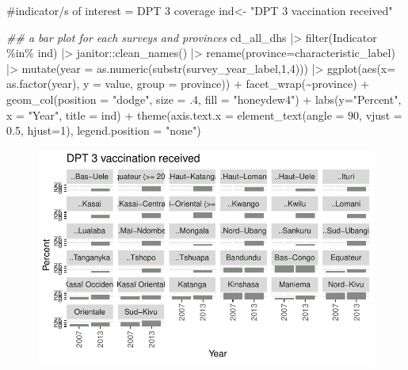 \documentclass[
  letterpaper,
  DIV=11,
  numbers=noendperiod]{scrreprt}
\newenvironment{Shaded}{\begin{snugshade}}{\end{snugshade}}
\newcommand{\AttributeTok}[1]{\textcolor[rgb]{0.40,0.45,0.13}{#1}}
\newcommand{\CommentTok}[1]{\textcolor[rgb]{0.37,0.37,0.37}{#1}}
\newcommand{\DecValTok}[1]{\textcolor[rgb]{0.68,0.00,0.00}{#1}}
\newcommand{\DocumentationTok}[1]{\textcolor[rgb]{0.37,0.37,0.37}{\textit{#1}}}
\newcommand{\FloatTok}[1]{\textcolor[rgb]{0.68,0.00,0.00}{#1}}
\newcommand{\FunctionTok}[1]{\textcolor[rgb]{0.28,0.35,0.67}{#1}}
\newcommand{\NormalTok}[1]{\textcolor[rgb]{0.00,0.23,0.31}{#1}}
\newcommand{\OtherTok}[1]{\textcolor[rgb]{0.00,0.23,0.31}{#1}}
\newcommand{\SpecialCharTok}[1]{\textcolor[rgb]{0.37,0.37,0.37}{#1}}
\newcommand{\StringTok}[1]{\textcolor[rgb]{0.13,0.47,0.30}{#1}}
\begin{document}
\begin{Shaded}
\begin{Highlighting}[]
\CommentTok{\#indicator/s of interest = DPT 3 coverage }
\NormalTok{ind}\OtherTok{\textless{}{-}} \StringTok{"DPT 3 vaccination received"}       

\DocumentationTok{\#\# a bar plot for each surveys and provinces    }
\NormalTok{cd\_all\_dhs }\SpecialCharTok{|\textgreater{}}      
   \FunctionTok{filter}\NormalTok{(Indicator }\SpecialCharTok{\%in\%}\NormalTok{ ind) }\SpecialCharTok{|\textgreater{}}
\NormalTok{  janitor}\SpecialCharTok{::}\FunctionTok{clean\_names}\NormalTok{() }\SpecialCharTok{|\textgreater{}}  
  \FunctionTok{rename}\NormalTok{(}\AttributeTok{province=}\NormalTok{characteristic\_label) }\SpecialCharTok{|\textgreater{}}
  \FunctionTok{mutate}\NormalTok{(}\AttributeTok{year =} \FunctionTok{as.numeric}\NormalTok{(}\FunctionTok{substr}\NormalTok{(survey\_year\_label,}\DecValTok{1}\NormalTok{,}\DecValTok{4}\NormalTok{))) }\SpecialCharTok{|\textgreater{}}
  \FunctionTok{ggplot}\NormalTok{(}\FunctionTok{aes}\NormalTok{(}\AttributeTok{x=} \FunctionTok{as.factor}\NormalTok{(year), }\AttributeTok{y =}\NormalTok{ value, }\AttributeTok{group =}\NormalTok{ province)) }\SpecialCharTok{+}
  \FunctionTok{facet\_wrap}\NormalTok{(}\SpecialCharTok{\textasciitilde{}}\NormalTok{province) }\SpecialCharTok{+}
  \FunctionTok{geom\_col}\NormalTok{(}\AttributeTok{position =} \StringTok{"dodge"}\NormalTok{, }\AttributeTok{size =}\NormalTok{ .}\DecValTok{4}\NormalTok{, }\AttributeTok{fill =} \StringTok{"honeydew4"}\NormalTok{) }\SpecialCharTok{+}
  \FunctionTok{labs}\NormalTok{(}\AttributeTok{y=}\StringTok{"Percent"}\NormalTok{, }\AttributeTok{x =} \StringTok{"Year"}\NormalTok{,}
       \AttributeTok{title =}\NormalTok{ ind) }\SpecialCharTok{+}
  \FunctionTok{theme}\NormalTok{(}\AttributeTok{axis.text.x =} \FunctionTok{element\_text}\NormalTok{(}\AttributeTok{angle =} \DecValTok{90}\NormalTok{, }\AttributeTok{vjust =} \FloatTok{0.5}\NormalTok{, }\AttributeTok{hjust=}\DecValTok{1}\NormalTok{),}
        \AttributeTok{legend.position =} \StringTok{"none"}\NormalTok{)  }
\end{Highlighting}
\end{Shaded}

\begin{figure}[H]

{\centering \includegraphics{module_02_files/figure-pdf/unnamed-chunk-14-1.pdf}

}

\end{figure}
\end{document}
